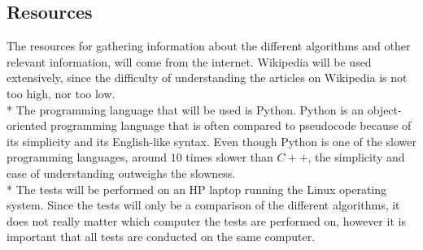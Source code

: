 \documentclass[main.tex]{subfiles}
\begin{document}
\subsection{Resources}
The resources for gathering information about the different algorithms and other
relevant information, will come from the internet. Wikipedia will be used
extensively, since the difficulty of understanding the articles on Wikipedia is
not too high, nor too low. \newline
\\*
The programming language that will be used is Python. Python is an
object-oriented programming language that is often compared to pseudocode
because of its simplicity and its English-like syntax. Even though Python is one
of the slower programming languages, around $10$ times slower than $C++$, the
simplicity and ease of understanding outweighs the slowness. \newline
\\*
The tests will be performed on an HP laptop running the Linux operating system.
Since the tests will only be a comparison of the different algorithms, it does
not really matter which computer the tests are performed on, however it is
important that all tests are conducted on the same computer.
\end{document}

